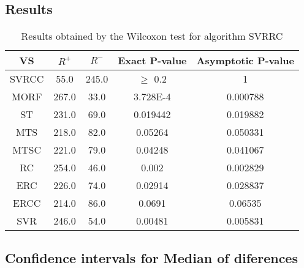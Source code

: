 \documentclass[a4paper,10pt]{article}
\begin{document}
\subsection{Results}

\begin{table}[!htp]
\centering\small
\begin{tabular}{
|c|c|c|c|c|}
\hline
 VS & $R^{+}$ & $R^{-}$ & Exact P-value & Asymptotic P-value \\ \hline 
SVRCC & 55.0 & 245.0 & $\geq$ 0.2 & 1\\ \hline 
MORF & 267.0 & 33.0 & 3.728E-4 & 0.000788\\ \hline 
ST & 231.0 & 69.0 & 0.019442 & 0.019882\\ \hline 
MTS & 218.0 & 82.0 & 0.05264 & 0.050331\\ \hline 
MTSC & 221.0 & 79.0 & 0.04248 & 0.041067\\ \hline 
RC & 254.0 & 46.0 & 0.002 & 0.002829\\ \hline 
ERC & 226.0 & 74.0 & 0.02914 & 0.028837\\ \hline 
ERCC & 214.0 & 86.0 & 0.0691 & 0.06535\\ \hline 
SVR & 246.0 & 54.0 & 0.00481 & 0.005831\\ \hline 

\end{tabular}
\caption{Results obtained by the Wilcoxon test for algorithm SVRRC}
\end{table}

\subsection{Confidence intervals for Median of diferences}
\end{document}
